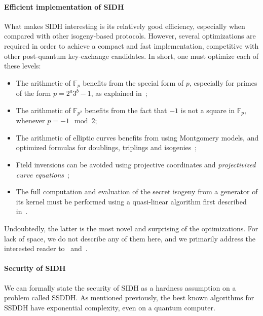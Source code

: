 \documentclass[10pt]{article}
\theoremstyle{plain}
\theoremstyle{definition}
\def\F{\ensuremath{\mathbb{F}}}
\begin{document}
\paragraph{Efficient implementation of SIDH}
What makes SIDH interesting is its relatively good efficiency,
especially when compared with other isogeny-based protocols. %
However, several optimizations are required in order to achieve a
compact and fast implementation, competitive with other post-quantum
key-exchange candidates. %
In short, one must optimize each of these levels:
\begin{itemize}
\item The arithmetic of $\F_p$ benefits from the special form of
  $p$, especially for primes of the form $p=2^a3^b-1$, as explained
  in~\cite{costello2016sidh,vercauteren-sidh-fp,cryptoeprint:2016:986};
\item The arithmetic of $\F_{p^2}$ benefits from the fact that $-1$ is
  not a square in $\F_p$, whenever $p=-1\mod 2$;
\item The arithmetic of elliptic curves benefits from using Montgomery
  models, and optimized formulas for doublings, triplings and
  isogenies~\cite{defeo+jao+plut12,costello2016sidh,cryptoeprint:2017:504};
\item Field inversions can be avoided using projective coordinates and
  \emph{projectivized curve equations}~\cite{costello2016sidh};
\item The full computation and evaluation of the secret isogeny from a
  generator of its kernel must be performed using a quasi-linear
  algorithm first described in~\cite{defeo+jao+plut12}.
\end{itemize}

Undoubtedly, the latter is the most novel and surprising of the
optimizations. %
For lack of space, we do not describe any of them here, and we
primarily address the interested reader to~\cite{defeo+jao+plut12}
and~\cite{costello2016sidh}.


\paragraph{Security of SIDH}
We can formally state the security of SIDH as a hardness assumption on
a problem called SSDDH. %
As mentioned previously, the best known algorithms for SSDDH have
exponential complexity, even on a quantum computer.
\end{document}
